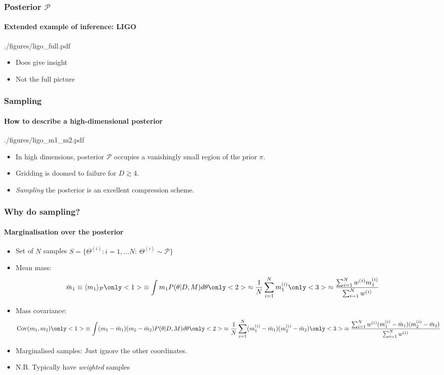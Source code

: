 \documentclass[%
]{beamer}
\newcommand{\posterior}{\mathcal{P}}
\newcommand{\prior}{\pi}
\begin{document}
\begin{frame}
    \frametitle{Posterior $\mathcal{P}$}
    \framesubtitle{Extended example of inference: LIGO}
    \begin{figleft}[0.65]{./figures/ligo_full.pdf}
		\begin{itemize}
          \item Does give insight
          \item Not the full picture
		\end{itemize}
    \end{figleft}
\end{frame}


\begin{frame}
    \frametitle{Sampling}
    \framesubtitle{How to describe a high-dimensional posterior}

	\begin{figright}{./figures/ligo_m1_m2.pdf}
		\begin{itemize}
          \item In high dimensions, posterior $\posterior$ occupies a vanishingly small region of the prior $\prior$.
          \item Gridding is doomed to failure for $D\gtrsim4$.
          \item {\em Sampling\/} the posterior is an excellent compression scheme.
		\end{itemize}
	\end{figright}
 
\end{frame}
%
\begin{frame}
    \frametitle{Why do sampling?}
    \framesubtitle{Marginalisation over the posterior}

    \begin{itemize}
        \item Set of $N$ samples $S = \{\Theta^{(i)}: i=1,\ldots N:\: \Theta^{(i)}\sim\mathcal{P}\}$
        \item Mean mass: \[
                \bar{m}_1 \equiv\langle m_1\rangle_\mathcal{P}
                \only<1>{\equiv \int m_1 P(\theta|D,M) d\theta }
                \only<2>{\approx \frac{1}{N}\sum_{i=1}^N m_1^{(i)}}
                \only<3>{\approx \frac{\sum_{i=1}^N w^{(i)} m_1^{(i)}}{\sum_{i=1}^N w^{(i)}}}
            \]
        \item Mass covariance: \[
                \mathrm{Cov}(m_1,m_2)
            \only<1>{\equiv \int (m_1-\bar{m}_1)(m_2-\bar{m}_2) P(\theta|D,M) d\theta }
                \only<2>{\approx \frac{1}{N}\sum_{i=1}^N (m_1^{(i)}-\bar{m}_1)(m_2^{(i)}-\bar{m}_2)}
                \only<3>{\approx \frac{\sum_{i=1}^N w^{(i)} (m_1^{(i)}-\bar{m}_1)(m_2^{(i)}-\bar{m}_2)}{\sum_{i=1}^N w^{(i)}}}
            \]
        \item Marginalised samples: Just ignore the other coordinates.
        \item N.B. Typically have {\em weighted\/} samples
    \end{itemize}
\end{frame}
\end{document}
